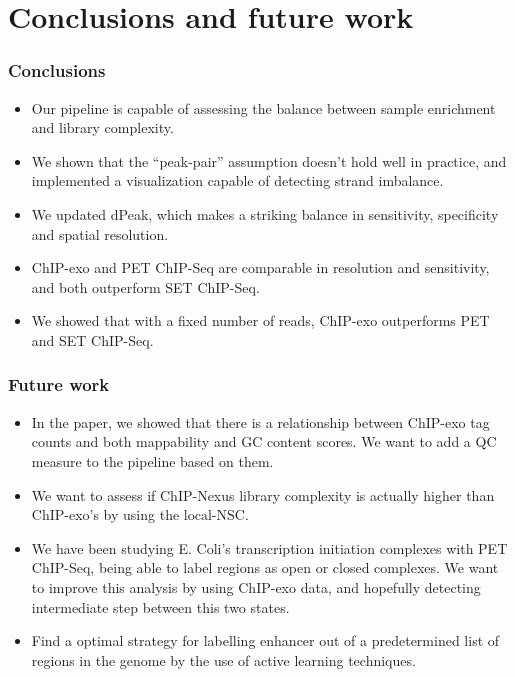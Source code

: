 \documentclass[compress,table,xcolor=dvipsnames]{beamer}\usepackage[]{graphicx}\usepackage[]{color}
\begin{document}
\section{Conclusions and future work}

\begin{frame}
  \frametitle{Conclusions}

  \begin{itemize}
  \item Our pipeline is capable of assessing the balance between
    sample enrichment and library complexity.
  \item We shown that the ``peak-pair'' assumption doesn't hold well
    in practice, and implemented a visualization capable of detecting
    strand imbalance.
  \item We updated dPeak, which makes a striking balance in
    sensitivity, specificity and spatial resolution.
  \item ChIP-exo and PET ChIP-Seq are comparable in resolution and
    sensitivity, and both outperform SET ChIP-Seq.
  \item We showed that with a fixed number of reads, ChIP-exo
    outperforms PET and SET ChIP-Seq.
  \end{itemize}
\end{frame}




\begin{frame}
\frametitle{Future work}  

\begin{itemize}
\item In the paper, we showed that there is a relationship between
  ChIP-exo tag counts and both mappability and GC content scores. We
  want to add a QC measure to the pipeline based on them.
\item We want to assess if ChIP-Nexus library complexity is actually higher than ChIP-exo's by using the $\mbox{local-NSC}$.
\item We have been studying E. Coli's transcription initiation
  complexes with PET ChIP-Seq, being able to label regions as open or
  closed complexes. We want to improve this analysis by using ChIP-exo
  data, and hopefully detecting intermediate step between this two
  states.
\item Find a optimal strategy for labelling enhancer out of a
  predetermined list of regions in the genome by the use of active
  learning techniques.
\end{itemize}

\end{frame}
\end{document}
